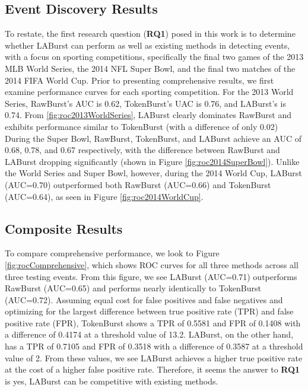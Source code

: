 \documentclass[letterpaper]{article}
\begin{document}
\subsection{Event Discovery Results}

To restate, the first research question (\textbf{RQ1}) posed in this work is to determine whether LABurst can perform as well as existing methods in detecting events, with a focus on sporting competitions, specifically the final two games of the 2013 MLB World Series, the 2014 NFL Super Bowl, and the final two matches of the 2014 FIFA World Cup.
Prior to presenting comprehensive results, we first examine performance curves for each sporting competition.
For the 2013 World Series, RawBurst's AUC is 0.62, TokenBurst's UAC is 0.76, and LABurst's is 0.74. 
From \ref{fig:roc2013WorldSeries}, LABurst clearly dominates RawBurst and exhibits performance similar to TokenBurst (with a difference of only 0.02)
During the Super Bowl, RawBurst, TokenBurst, and LABurst achieve an AUC of 0.68, 0.78, and 0.67 respectively, with the difference between RawBurst and LABurst dropping significantly (shown in Figure \ref{fig:roc2014SuperBowl}).
Unlike the World Series and Super Bowl, however, during the 2014 World Cup, LABurst (AUC=0.70) outperformed both RawBurst (AUC=0.66) and TokenBurst (AUC=0.64), as seen in Figure \ref{fig:roc2014WorldCup}.

\subsection{Composite Results}

To compare comprehensive performance, we look to Figure \ref{fig:rocComprehensive}, which shows ROC curves for all three methods across all three testing events.
From this figure, we see LABurst (AUC=0.71) outperforms RawBurst (AUC=0.65) and performs nearly identically to TokenBurst (AUC=0.72).
Assuming equal cost for false positives and false negatives and optimizing for the largest difference between true positive rate (TPR) and false positive rate (FPR), TokenBurst shows a TPR of 0.5581 and FPR of 0.1408 with a difference of 0.4174 at a threshold value of 13.2.
LABurst, on the other hand, has a TPR of 0.7105 and FPR of 0.3518 with a difference of 0.3587 at a threshold value of 2.
From these values, we see LABurst achieves a higher true positive rate at the cost of a higher false positive rate.
Therefore, it seems the answer to \textbf{RQ1} is yes, LABurst can be competitive with existing methods.
\end{document}
